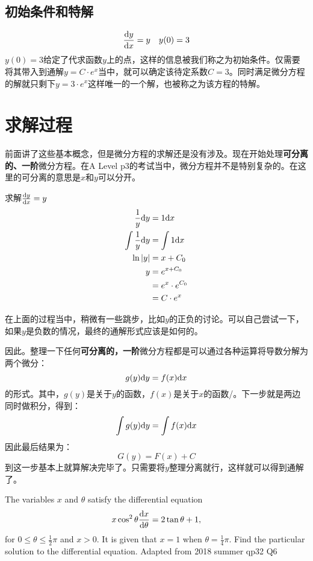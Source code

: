 \subsection*{初始条件和特解}

\[
	\frac{{\mathrm{d}} y}{{\mathrm{d}} x}=y \quad y(0)=3
\]
$y(0)=3$给定了代求函数$y$上的点，这样的信息被我们称之为初始条件。仅需要将其带入到通解$y=C\cdot e^x$当中，就可以确定该待定系数$C=3$。同时满足微分方程的解就只剩下$y=3\cdot e^x$这样唯一的一个解，也被称之为该方程的特解。
\clearpage

\section{求解过程}
前面讲了这些基本概念，但是微分方程的求解还是没有涉及。现在开始处理\textbf{可分离的、一阶}微分方程。在A Level p3的考试当中，微分方程并不是特别复杂的。在这里的可分离的意思是$x$和$y$可以分开。
\begin{ExampleBox}
求解$\frac{{\mathrm{d}} y}{{\mathrm{d}} x}=y$
\tcblower
\begin{align*}
\frac{1}{y}{\mathrm{d}} y &= 1{\mathrm{d}} x\\
\int \frac{1}{y}{\mathrm{d}} y &= \int 1{\mathrm{d}} x\\
\ln |y| &= x+C_0\\
y &=e^{x+C_0}\\
&=e^x\cdot e^{C_0} \\
&=C\cdot e^x
\end{align*}
\end{ExampleBox}

\begin{TaskBox}
在上面的过程当中，稍微有一些跳步，比如$y$的正负的讨论。可以自己尝试一下，如果$y$是负数的情况，最终的通解形式应该是如何的。
\end{TaskBox}

因此。整理一下任何\textbf{可分离的，一阶}微分方程都是可以通过各种运算将导数分解为两个微分：
\[
	g(y) {\mathrm{d}} y =f(x) {\mathrm{d}} x
\]
的形式。其中，$g(y)$是关于$y$的函数，$f(x)$是关于$x$的函数/。下一步就是两边同时做积分，得到：
\[
	\int g(y) {\mathrm{d}} y =\int f(x) {\mathrm{d}} x
\]
因此最后结果为：
\[
	G(y) =F(x)+C
\]
到这一步基本上就算解决完毕了。只需要将$y$整理分离就行，这样就可以得到通解了。

\begin{TaskBox}
The variables $x$ and $\theta$ satisfy the differential equation
\[
	x\cos^2\theta \frac{{\mathrm{d}} x}{{\mathrm{d}} \theta} =2\tan\theta +1,
\]
for $0\leqslant \theta \leqslant \frac{1}{2}\pi$ and $x > 0$. It is given that $x=1$ when $\theta =\frac{1}{4}\pi$. Find the particular solution to the differential equation.
\makebox{}\hfill Adapted from 2018 summer qp32 Q6
\end{TaskBox}
\clearpage


